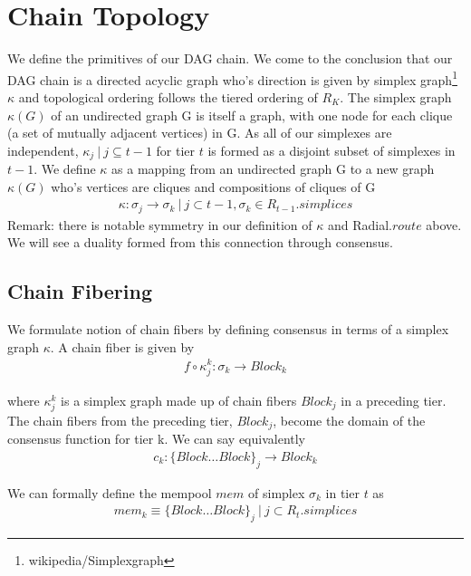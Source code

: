 \documentclass{article}
\begin{document}
\section{Chain Topology}
We define the primitives of our DAG chain. We come to the conclusion that our DAG chain is a directed acyclic graph who's direction is given by simplex graph\footnote{wikipedia/Simplexgraph} $\kappa$ and topological ordering follows the tiered ordering of $R_K$. The simplex graph $\kappa(G)$ of an undirected graph G is itself a graph, with one node for each clique (a set of mutually adjacent vertices) in G. As all of our simplexes are independent, $\kappa_j \ | \ j \subseteq t-1$ for tier $t$ is formed as a disjoint subset of simplexes in $t-1$. We define $\kappa$ as a mapping from an undirected graph G to a new graph $\kappa(G)$ who's vertices are cliques and compositions of cliques of G
\begin{equation} \label{eq1}
\begin{split}
\kappa: \sigma_j \rightarrow \sigma_k \ | \ j \subset t-1, \sigma_k \in R_{t-1}.simplices
\end{split}
\end{equation}
Remark: there is notable symmetry in our definition of $\kappa$ and Radial.$route$ above. We will see a duality formed from this connection through consensus.

\subsection{Chain Fibering}
We formulate notion of chain fibers by defining consensus in terms of a simplex graph $\kappa$. A chain fiber is given by 
\begin{equation} \label{eq1}
\begin{split}
f \circ \kappa_j^{k}: \sigma_k  \rightarrow Block_k
\end{split}
\end{equation}

where $\kappa_j^{k}$ is a simplex graph made up of chain fibers $Block_j$ in a preceding tier. The chain fibers from the preceding tier, $Block_j$, become the domain of the consensus function for tier k. We can say equivalently
\begin{equation} \label{eq1}
\begin{split}
c_k: \{Block \dots Block\}_j \rightarrow Block_k
\end{split}
\end{equation}

We can formally define the mempool $mem$ of simplex $\sigma_k$ in tier $t$ as 
\begin{equation} \label{eq1}
\begin{split}
mem_k \equiv \{Block \dots Block\}_j \ | \ j \subset R_t.simplices
\end{split}
\end{equation}
\end{document}
